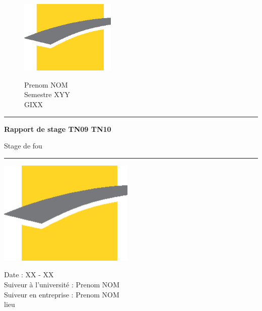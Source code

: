 \begin{titlepage}
    \centering
    
    \begin{figure}[h]
            \centering
            \begin{minipage}{.5\textwidth}
                \includegraphics[height=3.5cm]{assets/UTC.eps}
            \end{minipage}%
            \begin{minipage}{.5\textwidth}
                \begin{flushright}
                {\Large
                Prenom NOM\\
                Semestre XYY\\
                GIXX\\
                }
                \end{flushright}
            \end{minipage}
        \end{figure}

    \vspace{2cm}

    {\color{jauneUTC}\rule{\textwidth}{2pt}}
    

    \vspace{.7\baselineskip}
    {\huge \textbf{Rapport de stage TN09 TN10}}

    \vspace*{.5cm}
    {\LARGE Stage de fou}
    
    {\color{jauneUTC}\rule{\textwidth}{2pt}}

    \vspace{3cm}

    \includegraphics[height=5cm]{assets/UTC.eps}



    \vfill
    Date :  XX - XX\\
    Suiveur à l'université : Prenom NOM\\
    Suiveur en entreprise : Prenom NOM\\
    lieu\\
\end{titlepage}

